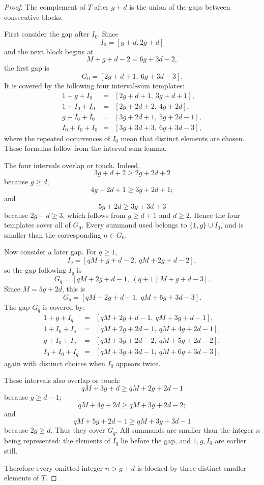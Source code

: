 \documentclass[11pt]{article}
\begin{document}
\begin{proof}
The complement of \(T\) after \(g+d\) is the union of the gaps between consecutive blocks.

First consider the gap after \(I_0\). Since
\[
I_0=[g+d,2g+d]
\]
and the next block begins at
\[
M+g+d-2=6g+3d-2,
\]
the first gap is
\[
G_0=[2g+d+1,\ 6g+3d-3].
\]
It is covered by the following four interval-sum templates:
\[
\begin{array}{rcl}
1+g+I_0 &=& [2g+d+1,\ 3g+d+1],\\
1+I_0+I_0 &=& [2g+2d+2,\ 4g+2d],\\
g+I_0+I_0 &=& [3g+2d+1,\ 5g+2d-1],\\
I_0+I_0+I_0 &=& [3g+3d+3,\ 6g+3d-3],
\end{array}
\]
where the repeated occurrences of \(I_0\) mean that distinct elements are chosen. These formulas follow from the interval-sum lemma.

The four intervals overlap or touch. Indeed,
\[
3g+d+2\geq 2g+2d+2
\]
because \(g\geq d\);
\[
4g+2d+1\geq 3g+2d+1;
\]
and
\[
5g+2d\geq 3g+3d+3
\]
because \(2g-d\geq 3\), which follows from \(g\geq d+1\) and \(d\geq 2\). Hence the four templates cover all of \(G_0\). Every summand used belongs to \(\{1,g\}\cup I_0\), and is smaller than the corresponding \(n\in G_0\).

Now consider a later gap. For \(q\geq 1\),
\[
I_q=[qM+g+d-2,\ qM+2g+d-2],
\]
so the gap following \(I_q\) is
\[
G_q=[qM+2g+d-1,\ (q+1)M+g+d-3].
\]
Since \(M=5g+2d\), this is
\[
G_q=[qM+2g+d-1,\ qM+6g+3d-3].
\]
The gap \(G_q\) is covered by:
\[
\begin{array}{rcl}
1+g+I_q &=& [qM+2g+d-1,\ qM+3g+d-1],\\
1+I_0+I_q &=& [qM+2g+2d-1,\ qM+4g+2d-1],\\
g+I_0+I_q &=& [qM+3g+2d-2,\ qM+5g+2d-2],\\
I_0+I_0+I_q &=& [qM+3g+3d-1,\ qM+6g+3d-3],
\end{array}
\]
again with distinct choices when \(I_0\) appears twice.

These intervals also overlap or touch:
\[
qM+3g+d\geq qM+2g+2d-1
\]
because \(g\geq d-1\);
\[
qM+4g+2d\geq qM+3g+2d-2;
\]
and
\[
qM+5g+2d-1\geq qM+3g+3d-1
\]
because \(2g\geq d\). Thus they cover \(G_q\). All summands are smaller than the integer \(n\) being represented: the elements of \(I_q\) lie before the gap, and \(1,g,I_0\) are earlier still.

Therefore every omitted integer \(n>g+d\) is blocked by three distinct smaller elements of \(T\).
\end{proof}
\end{document}
